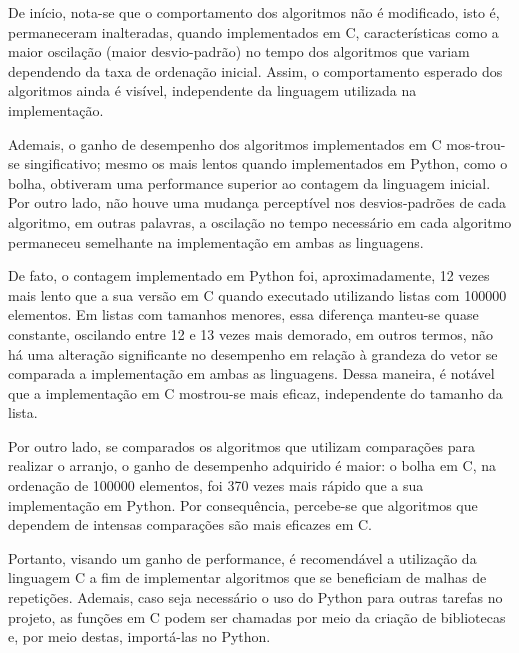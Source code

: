 De início, nota-se que o comportamento dos algoritmos não é modificado, isto é, permaneceram inalteradas, quando implementados em C, características como a maior oscilação (maior desvio-padrão) no tempo dos algoritmos que variam dependendo da taxa de ordenação inicial.
Assim, o comportamento esperado dos algoritmos ainda é visível, independente da linguagem utilizada na implementação.


Ademais, o ganho de desempenho dos algoritmos implementados em C mos-\linebreak trou-se singificativo; mesmo os mais lentos quando implementados em Python, como o bolha, obtiveram uma performance superior ao contagem da linguagem inicial.
Por outro lado, não houve uma mudança perceptível nos desvios-padrões de cada algoritmo, em outras palavras, a oscilação no tempo necessário em cada algoritmo permaneceu semelhante na implementação em ambas as linguagens.


De fato, o contagem implementado em Python foi, aproximadamente, 12 vezes mais lento que a sua versão em C quando executado utilizando listas com 100000 elementos. Em listas com tamanhos menores, essa diferença manteu-se quase constante, oscilando entre 12 e 13 vezes mais demorado, em outros termos, não há uma alteração significante no desempenho em relação à grandeza do vetor se comparada a implementação em ambas as linguagens. Dessa maneira, é notável que a implementação em C mostrou-se mais eficaz, independente do tamanho da lista.

Por outro lado, se comparados os algoritmos que utilizam comparações para realizar o arranjo, o ganho de desempenho adquirido é maior: o bolha em C, na ordenação de 100000 elementos, foi 370 vezes mais rápido que a sua implementação em Python. Por consequência, percebe-se que algoritmos que dependem de intensas comparações são mais eficazes em C.


Portanto, visando um ganho de performance, é recomendável a utilização da linguagem C a fim de implementar algoritmos que se beneficiam de malhas de repetições.
Ademais, caso seja necessário o uso do Python para outras tarefas no projeto, as funções em C podem ser chamadas por meio da criação de bibliotecas e, por meio destas, importá-las no Python.